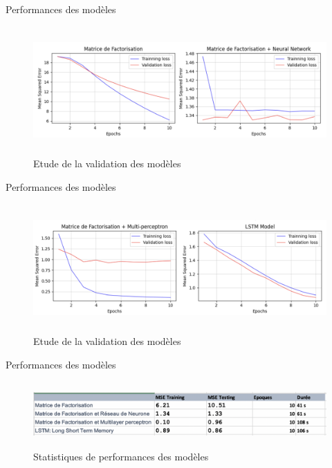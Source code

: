\documentclass[xelatex,12pt]{beamer}
\begin{document}
\begin{frame}{Performances des modèles}
\begin{figure}[!htb]
\begin{center}
\includegraphics[width=11.5cm,height=4.9cm]{images/validation_mode_1.png}
\caption[Etude de la validation des modèles]{Etude de la validation des modèles}
\label{monlabel}
\end{center}
\end{figure}
\end{frame}

\begin{frame}{Performances des modèles}
\begin{figure}[!htb]
\begin{center}
\includegraphics[width=11.5cm,height=4.9cm]{images/validation_mode_2.png}
\caption[Etude de la validation des modèles]{Etude de la validation des modèles}
\label{monlabel}
\end{center}
\end{figure}
\end{frame}

\begin{frame}{Performances des modèles}
\begin{figure}[!htb]
\begin{center}
\includegraphics[width=11.5cm,height=2.5cm]{images/validation_statistics.png}
\caption[Statistiques de performances des modèles]{Statistiques de performances des modèles }
\label{monlabel}
\end{center}
\end{figure}
\end{frame}
\end{document}
